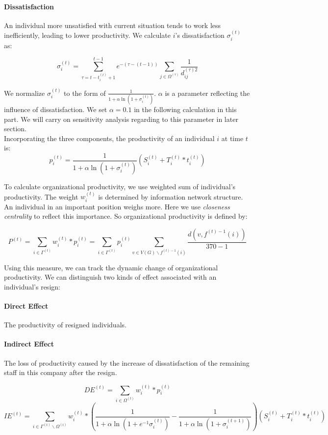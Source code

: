 \documentclass[tcn = 37075, sheet = false, abstract = false]{mcmthesis}
\begin{document}
\paragraph{Dissatisfaction}
An individual more unsatisfied with current situation tends to work less inefficiently, leading to lower productivity. We calculate $i$'s dissatisfaction $\sigma_i^{(t)}$ as:

$$\displaystyle \sigma_i^{(t)}=\sum_{\tau=t-t_i^{(t)}+1}^{t-1}e^{-(\tau-(t-1))}\sum_{j\in \Omega^{(\tau)}}\frac{1}{d_{ij}^{(\tau)2}}$$

We normalize $\sigma_i^{(t)}$ to the form of $\frac{1}{1+\alpha\ln{(1+\sigma_i^{(t)})}}$. $\alpha$ is a parameter reflecting the influence of dissatisfaction. We set $\displaystyle \alpha = 0.1$ in the following calculation in this part. We will carry on sensitivity analysis regarding to this parameter in later section.\\

Incorporating the three components, the productivity of an individual $i$ at time $t$ is:
$$ p_i^{(t)}=\frac{1}{1+\alpha\ln{(1+\sigma_i^{(t)})}}(S_i^{(t)}+T_i^{(t)}*t_i^{(t)})$$

To calculate organizational productivity, we use weighted sum of individual's productivity. The weight $w_i^{(t)}$ is determined by information network structure. An individual in an important position weighs more. Here we use \textit{closeness centrality} to reflect this importance. So organizational productivity is defined by:

$$\displaystyle P^{(t)}=\sum\limits_{i\in\Gamma^{(t)}} w_i^{(t)}*p_i^{(t)}=\sum\limits_{i\in\Gamma^{(t)}}p_i^{(t)}\sum\limits_{v\in V(G)\backslash f^{(t)-1}(i)}\frac{d(v,f^{(t)-1}(i))}{370-1}$$

Using this measure, we can track the dynamic change of organizational productivity. We can distinguish two kinds of effect associated with an individual's resign:

\paragraph{Direct Effect} The productivity of resigned individuals.
\paragraph{Indirect Effect}
The loss of productivity caused by the increase of dissatisfaction of the remaining staff in this company after the resign.

$$DE^{(t)}=\sum\limits_{i\in\Omega^{(t)}}w_i^{(t)}*p_i^{(t)}$$ $$IE^{(t)}=\sum\limits_{i\in\Gamma^{(t)}\backslash\Omega^{(t)}} w_i^{(t)}*(\frac{1}{1+\alpha\ln{(1+e^{-1}\sigma_i^{(t)})}}-\frac{1}{1+\alpha\ln{(1+\sigma_i^{(t+1)})}})(S_i^{(t)}+T_i^{(t)}*t_i^{(t)})$$
\end{document}
